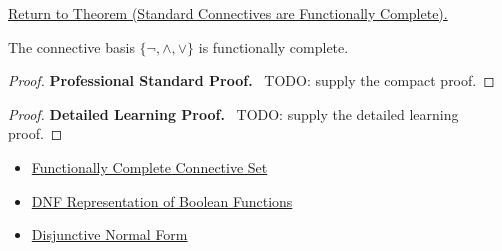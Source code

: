 \newpage
{}
\label{prf:standard-connectives-functionally-complete-propositional-logic}

\begin{remark*}[Return]
\hyperref[thm:standard-connectives-functionally-complete-propositional-logic]{Return to Theorem (Standard Connectives are Functionally Complete).}
\end{remark*}

\begin{theorem*}
The connective basis \(\{\neg,\land,\lor\}\) is functionally complete.
\end{theorem*}

\begin{proof}
\textbf{Professional Standard Proof.}~
TODO: supply the compact proof.
\end{proof}

\begin{proof}
\textbf{Detailed Learning Proof.}~
TODO: supply the detailed learning proof.
\end{proof}

\begin{remark*}
\end{remark*}

\begin{dependencies}
\begin{itemize}
  \item \hyperref[def:functionally-complete-connective-set-propositional-logic]{Functionally Complete Connective Set}
  \item \hyperref[thm:dnf-representation-of-boolean-functions-propositional-logic]{DNF Representation of Boolean Functions}
  \item \hyperref[def:disjunctive-normal-form-propositional-logic]{Disjunctive Normal Form}
\end{itemize}
\end{dependencies}

\clearpage
